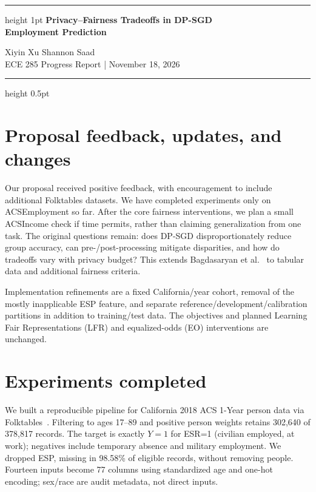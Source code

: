 \documentclass[11pt,letterpaper]{article}
\begin{document}
\begin{center}
\hrule height 1pt\vspace{5pt}
{\large\bfseries Privacy--Fairness Tradeoffs in DP-SGD\\Employment Prediction}\par
\vspace{4pt}
Xiyin Xu \qquad Shannon Saad\\
ECE 285 Progress Report \quad | \quad November 18, 2026
\vspace{5pt}\hrule height 0.5pt
\end{center}
\vspace{-3pt}

\section{Proposal feedback, updates, and changes}
Our proposal received positive feedback, with encouragement to include additional Folktables datasets. We have completed experiments only on ACSEmployment so far. After the core fairness interventions, we plan a small ACSIncome check if time permits, rather than claiming generalization from one task. The original questions remain: does DP-SGD disproportionately reduce group accuracy, can pre-/post-processing mitigate disparities, and how do tradeoffs vary with privacy budget? This extends Bagdasaryan et al.~\cite{bagdasaryan2019} to tabular data and additional fairness criteria.

Implementation refinements are a fixed California/year cohort, removal of the mostly inapplicable ESP feature, and separate reference/development/calibration partitions in addition to training/test data. The objectives and planned Learning Fair Representations (LFR) and equalized-odds (EO) interventions are unchanged.

\section{Experiments completed}
We built a reproducible pipeline for California 2018 ACS 1-Year person data via Folktables~\cite{ding2021}. Filtering to ages 17--89 and positive person weights retains 302,640 of 378,817 records. The target is exactly $Y=1$ for ESR=1 (civilian employed, at work); negatives include temporary absence and military employment. We dropped ESP, missing in 98.58\% of eligible records, without removing people. Fourteen inputs become 77 columns using standardized age and one-hot encoding; sex/race are audit metadata, not direct inputs.
\end{document}
